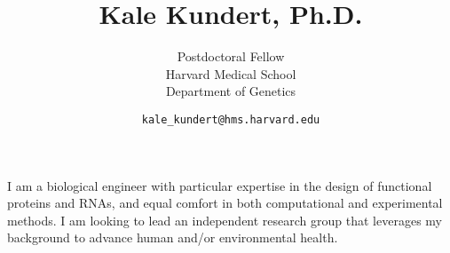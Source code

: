 \documentclass{article}
\title{Kale Kundert, Ph.D.}
\author{Postdoctoral Fellow\\Harvard Medical School\\Department of Genetics}
\date{\texttt{kale\_kundert@hms.harvard.edu}}
\begin{document}
 \maketitle

 \pagestyle{empty}
 \thispagestyle{empty}

 I am a biological engineer with particular expertise in the design of 
 functional proteins and RNAs, and equal comfort in both computational and 
 experimental methods.  I am looking to lead an independent research group 
 that leverages my background to advance human and/or environmental health.
 
 
 
 
 
 
 \clearpage
 
 
 
\end{document}
